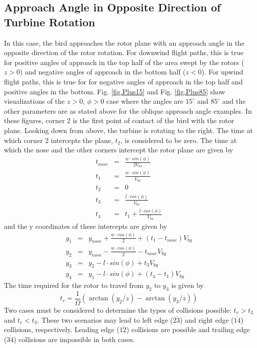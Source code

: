 \documentclass[10pt,conference]{IEEEtran}
\begin{document}
\subsection{Approach Angle in Opposite Direction of Turbine Rotation}
In this case, the bird approaches the rotor plane with an approach angle in the opposite direction of the rotor
rotation. For downwind flight paths, this is true for positive angles of approach in the top half of the area swept by
the rotors ($z>0$) and negative angles of approach in the bottom half ($z<0$). For upwind flight paths, this is true
for for negative angles of approach in the top half and positive angles in the bottom. Fig. \ref{fig.Plus15} and Fig.
\ref{fig.Plus85} show visualizations of the $z>0$, $\phi>0$ case where the angles are $15^\circ$ and $85^\circ$ and the
other parameters are as stated above for the oblique approach angle examples. In these figures, corner 2 is the first
point of contact of the bird with the rotor plane. Looking down from above, the turbine is rotating to the right. The
time at which corner 2 intercepts the plane, $t_2$, is considered to be zero. The time at which the nose and the other
corners intercept the rotor plane are given by
\begin{eqnarray*}
    t_{nose} &=& \frac{w \cdot sin(\phi)}{2 V_{bx}}\\
    t_1 &=& \frac{w \cdot sin(\phi)}{V_{bx}}\\
    t_2 &=& 0\\
    t_3 &=& \frac{l \cdot cos(\phi)}{V_{bx}}\\
    t_4 &=& t_1 + \frac{l \cdot cos(\phi)}{V_{bx}}
\end{eqnarray*}
and the y coordinates of these intercepts are given by
\begin{eqnarray*}
    y_1 &=& y_{nose}+\frac{w \cdot cos(\phi)}{2}+(t_1-t_{nose})V_{by}\\
    y_2 &=& y_{nose}-\frac{w \cdot cos(\phi)}{2}-t_{nose}V_{by}\\
    y_3 &=& y_2-l \cdot sin(\phi) + t_3V_{by}\\
    y_4 &=& y_1-l \cdot sin(\phi) + (t_4-t_1)V_{by}
\end{eqnarray*}
The time required for the rotor to travel from $y_2$ to $y_3$ is given by
\begin{equation*}
    t_r = \frac{1}{\Omega}(\arctan(y_2/z)-\arctan(y_3/z))
\end{equation*}
Two cases must be considered to determine the types of collisions possible: $t_r>t_3$ and $t_r<t_3$. These two
scenarios may lead to left edge ($\overline{23}$) and right edge ($\overline{14}$) collisions, respectively. Leading
edge ($\overline{12}$) collisions are possible and trailing edge ($\overline{34}$) collisions are impossible in both
cases.
\end{document}
